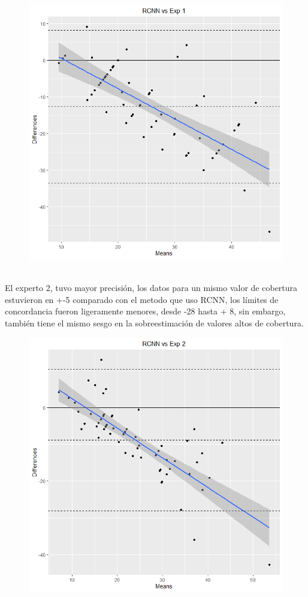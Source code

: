 \documentclass[journal,article,submit,moreauthors,pdftex]{Definitions/mdpi}
\begin{document}
\begin{figure}[H]
    \centering
    \includegraphics[scale=0.4]{RCNN-EXP1.png}
     \centering
    \caption{}
\end{figure}
\\
El experto 2, tuvo mayor precisión, los datos para un mismo valor de cobertura estuvieron en +-5 comparado con el metodo que uso RCNN, los límites de concordancia fueron ligeramente menores, desde -28 hasta + 8, sin embargo, también tiene el mismo sesgo en la sobreestimación de valores altos de cobertura.
\begin{figure}[H]
    \centering
    \includegraphics[scale=0.4]{RCNN-EXP2.png}
     \centering
    \caption{}
\end{figure}
\end{document}
